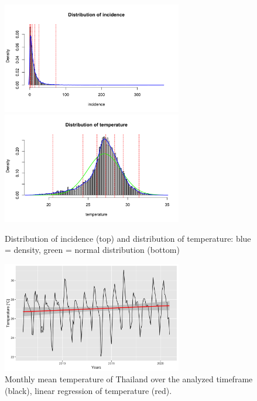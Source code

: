 \documentclass[parskip]{scrartcl}
\begin{document}
\begin{figure}[htbp] 
	\centering
	\includegraphics[width=0.7\textwidth]{fig/dist_incidence.png}
	\includegraphics[width=0.7\textwidth]{fig/dist_temp.png}
	\caption{Distribution of incidence (top)
		and distribution of temperature: blue = density, green = normal distribution (bottom)}
	\label{fig:dist_temp_inc}
\end{figure}


\begin{figure}[htbp] 
	\centering
	\includegraphics[width=0.7\textwidth]{fig/temp_over_years.png}
	\caption{Monthly mean temperature of Thailand over the analyzed timeframe (black), linear regression of temperature (red).}
	\label{fig:temp_over_years}
\end{figure}
\end{document}
